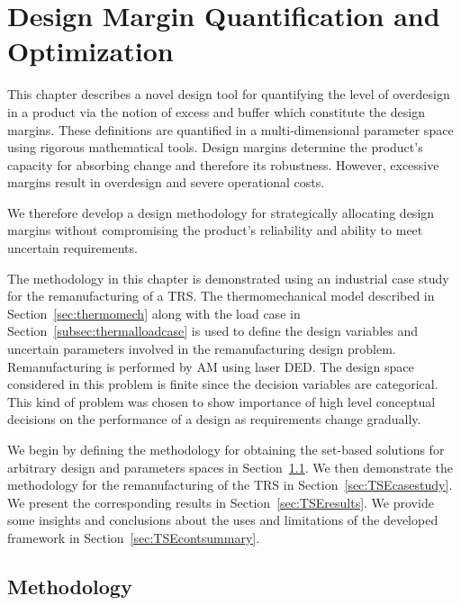\chapter{Design Margin Quantification and Optimization}
\label{ch:TSEcont}

This chapter describes a novel design tool for quantifying the level of overdesign in a product via the notion of excess and buffer which constitute the design margins. These definitions are quantified in a multi-dimensional parameter space using rigorous mathematical tools. Design margins determine the product's capacity for absorbing change and therefore its robustness. However, excessive margins result in overdesign and severe operational costs.

We therefore develop a design methodology for strategically allocating design margins without compromising the product's reliability and ability to meet uncertain requirements.

The methodology in this chapter is demonstrated using an industrial case study for the remanufacturing of a \ac{TRS}. The thermomechanical model described in Section~\ref{sec:thermomech} along with the load case in Section~\ref{subsec:thermalloadcase} is used to define the design variables and uncertain parameters involved in the remanufacturing design problem. Remanufacturing is performed by \ac{AM} using laser \ac{DED}. The design space considered in this problem is finite since the decision variables are categorical. This kind of problem was chosen to show importance of high level conceptual decisions on the performance of a design as requirements change gradually.

We begin by defining the methodology for obtaining the set-based solutions for arbitrary design and parameters spaces in Section~\ref{sec:TSEmethods}. We then demonstrate the methodology for the remanufacturing of the \ac{TRS} in Section~\ref{sec:TSEcasestudy}. We present the corresponding results in Section~\ref{sec:TSEresults}. We provide some insights and conclusions about the uses and limitations of the developed framework in Section~\ref{sec:TSEcontsummary}.

\section{Methodology} \label{sec:TSEmethods}

